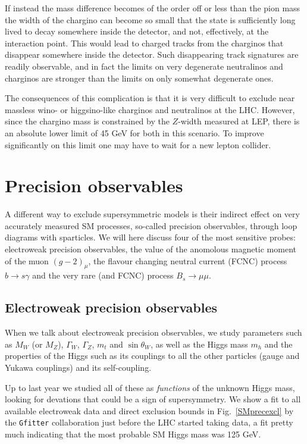 \documentclass[notes.tex]{subfiles}
\begin{document}
If instead the mass difference becomes of the order off or less than the pion mass the width of the chargino can become so small that the state is sufficiently long lived to decay somewhere inside the detector, and not, effectively, at the interaction point. This would lead to charged tracks from the charginos that disappear somewhere inside the detector. Such disappearing track signatures are readily observable, and in fact the limits on very degenerate neutralinos and charginos are stronger than the limits on only somewhat degenerate ones.

The consequences of this complication is that it is very difficult to exclude near massless wino- or higgsino-like charginos and neutralinos at the LHC. However, since the chargino mass is constrained by the $Z$-width measured at LEP, there is an absolute lower limit of 45 GeV for both in this scenario. To improve significantly on this limit one may have to wait for a new lepton collider.


\section{Precision observables}
A different way to exclude supersymmetric models is their indirect effect on very accurately measured SM processes, so-called precision observables, through loop diagrams with sparticles. We will here discuss four of the most sensitive probes: electroweak precision observables, the value of the anomolous magnetic moment of the muon $(g-2)_\mu$, the flavour changing neutral current (FCNC) process $b\to s\gamma$ and the very rare (and FCNC) process $B_s\to\mu\mu$.

\subsection{Electroweak precision observables}
When we talk about electroweak precision observables, we study parameters such as $M_W$ (or $M_Z$), $\Gamma_W$, $\Gamma_Z$, $m_t$ and $\sin\theta_W$, as well as the Higgs mass $m_h$ and the properties of the Higgs such as its couplings to all the other particles (gauge and Yukawa couplings) and its self-coupling. 

Up to last year we studied all of these as {\it functions} of the unknown Higgs mass, looking for devations that could be a sign of supersymmetry. We show a fit to all available electroweak data and direct exclusion bounds in Fig.~\ref{SMprecexcl} by the {\tt Gfitter} collaboration just before the LHC started taking data, a fit pretty much indicating that the most probable SM Higgs mass was 125 GeV. 
\end{document}
